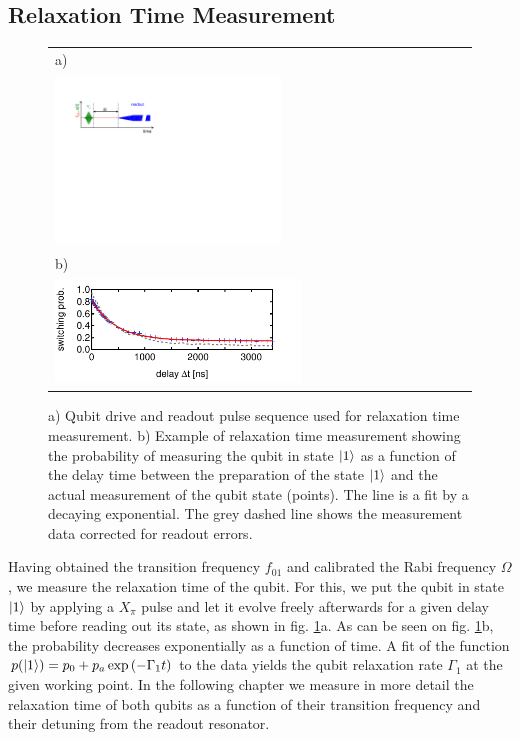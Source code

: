 \subsection{Relaxation Time Measurement}

\begin{figure}
\begin{tabular}{l}
a) \\ \includegraphics[width=0.55\textwidth]{"./material/figures/measurement/qubit_t1_measurement"} \\
b) \\ \includegraphics[width=0.6\textwidth]{"./data/ct5/2011_04_21 - grover and tomo/example - qubit 2 t1"} \\
\end{tabular}
\caption[]{a) Qubit drive and readout pulse sequence used for relaxation time measurement. b) Example of relaxation time measurement showing the probability of measuring the qubit in state $\left| 1 \right>$ as a function of the delay time between the preparation of the state $\left| 1 \right>$ and the actual measurement of the qubit state (points). The line is a fit by a decaying exponential. The grey dashed line shows the measurement data corrected for readout errors.}
\label{fig:qubit_t1_example}
\end{figure}

Having obtained the transition frequency $f_{01}$ and calibrated the Rabi frequency $\Omega$, we measure the relaxation time of the qubit. For this, we put the qubit in state $\left| 1 \right>$ by applying a $X_{\pi}$ pulse and let it evolve freely afterwards for a given delay time before reading out its state, as shown in fig. \ref{fig:qubit_t1_example}a. As can be seen on fig. \ref{fig:qubit_t1_example}b, the probability decreases exponentially as a function of time. A fit of the function $p(\left| 1 \right>) = p_0+p_a\exp{(-\Gamma_1 t)}$ to the data yields the qubit relaxation rate $\Gamma_1$ at the given working point. In the following chapter we measure in more detail the relaxation time of both qubits as a function of their transition frequency and their detuning from the readout resonator.

